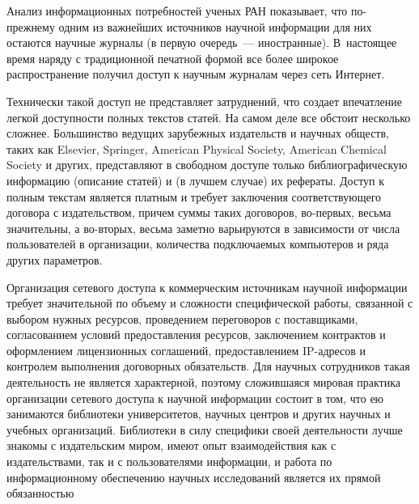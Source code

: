       \begin{multicols}{2}

            \label{st\stat}

     Анализ информационных потребностей ученых РАН показывает, что 
по-прежнему одним из важнейших источников научной информации для них 
остаются научные журналы (в первую очередь~--- иностранные). 
В~настоящее время наряду с традиционной печатной формой все более 
широкое распространение получил доступ к научным журналам через сеть 
Интернет.
     
     Технически такой доступ не представляет затруднений, что создает 
впечатление легкой доступности полных текстов статей. На самом деле все 
обстоит несколько сложнее. Большинство ведущих зарубежных издательств 
и научных обществ, таких как Elsevier, Springer, American Physical Society, 
American Chemical Society и других, представляют в свободном доступе 
только биб\-лио\-гра\-фи\-че\-скую информацию (описание статей) и (в лучшем 
случае) их рефераты. Доступ к полным текстам является платным и требует 
заключения соответствующего договора с издательством, причем суммы 
таких договоров, во-пер\-вых, весьма значительны, а во-вто\-рых, весьма 
заметно варьируются в зависимости от числа пользователей в организации, 
количества подключаемых компьютеров и ряда других па\-ра\-мет\-ров.
     
     Организация сетевого доступа к коммерческим\linebreak
      источникам научной 
информации требует значительной по объему и сложности специфической\linebreak 
работы, связанной с выбором нужных ресурсов, проведением переговоров с 
поставщиками, согласованием условий предоставления ресурсов, 
заключением контрактов и оформлением лицензионных соглашений, 
предоставлением IP-ад\-ре\-сов и контролем выполнения договорных 
обязательств. Для научных сотрудников такая деятельность не является 
характерной, поэтому сложившаяся мировая практика организации сетевого 
доступа к научной информации состоит в том, что ею занимаются 
биб\-лио\-те\-ки университетов, научных центров и других научных и учебных 
организаций. Биб\-лио\-те\-ки в силу специфики своей деятельности лучше 
знакомы с издательским миром, имеют опыт взаимодействия как с 
издательствами, так и с пользователями информации, и работа по 
информационному обеспечению научных исследований является их прямой 
обязанностью 
     

\end{multicols}
